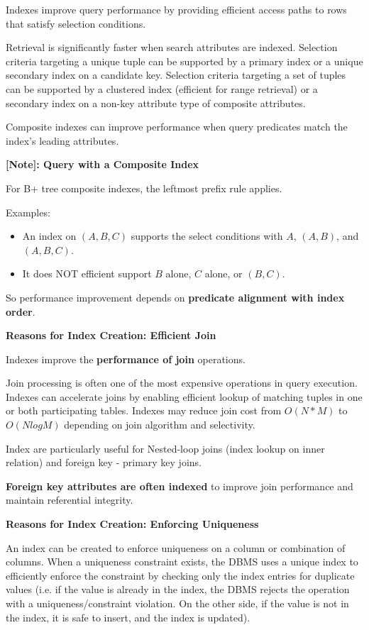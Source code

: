 \documentclass[11pt]{article}
\newcommand{\vs}[]{
    \vspace{11pt}
}
\newcommand{\boldsec}[1]{
    \vspace{11pt}
    \textbf{#1}
    \vspace{11pt}
}
\begin{document}
Indexes improve query performance by providing efficient access paths to rows that satisfy selection conditions.

Retrieval is significantly faster when search attributes are indexed. Selection criteria targeting a unique tuple can be supported by a primary index or a unique secondary index on a candidate key. Selection criteria targeting a set of tuples can be supported by a clustered index (efficient for range retrieval) or a secondary index on a non-key attribute type of composite attributes.

Composite indexes can improve performance when query predicates match the index's leading attributes.

\boldsec{[Note]: Query with a Composite Index}

For B+ tree composite indexes, the leftmost prefix rule applies.

Examples:
\begin{itemize}
    \item An index on $(A,B,C)$ supports the select conditions with $A$, $(A,B)$, and $(A,B,C)$.
    \item It does NOT efficient support $B$ alone, $C$ alone, or $(B,C)$.
\end{itemize}
\vs

So performance improvement depends on \textbf{predicate alignment with index order}.

\boldsec{Reasons for Index Creation: Efficient Join}

Indexes improve the \textbf{performance of join} operations.

Join processing is often one of the most expensive operations in query execution. Indexes can accelerate joins by enabling efficient lookup of matching tuples in one or both participating tables. Indexes may reduce join cost from $O(N*M)$ to $O(NlogM)$ depending on join algorithm and selectivity.

Index are particularly useful for Nested-loop joins (index lookup on inner relation) and foreign key - primary key joins.

\textbf{Foreign key attributes are often indexed} to improve join performance and maintain referential integrity.

\boldsec{Reasons for Index Creation: Enforcing Uniqueness}

An index can be created to enforce uniqueness on a column or combination of columns. When a uniqueness constraint exists, the DBMS uses a unique index to efficiently enforce the constraint by checking only the index entries for duplicate values (i.e. if the value is already in the index, the DBMS rejects the operation with a uniqueness/constraint violation. On the other side, if the value is not in the index, it is safe to insert, and the index is updated).
\end{document}

